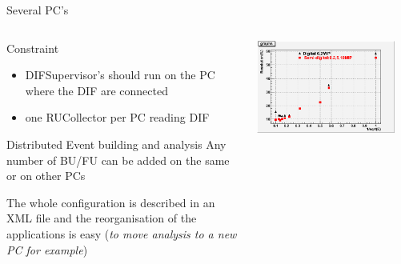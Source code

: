 \begin{frame}{Several PC's}

  \begin{columns}
    \begin{column}{0.5\textwidth}

      \begin{block}{Constraint}
        \begin{itemize}
        \item DIFSupervisor's should run on the PC where the DIF are connected 
        \item one RUCollector per PC reading DIF
        \end{itemize}
      \end{block}
      \pause
      \begin{block}{Distributed Event building and analysis}
        Any number of BU/FU can be added on the same or on other PCs

        The whole configuration is described in an XML file and the reorganisation of the applications is easy ({\sl to move analysis to a new PC for example})
      \end{block}
    \end{column}
    \begin{column}{0.5\textwidth}
      \centerline{\includegraphics[width=0.9\textwidth]{images/DigitalSemiDigital}}
    \end{column}
  \end{columns}


\end{frame}



